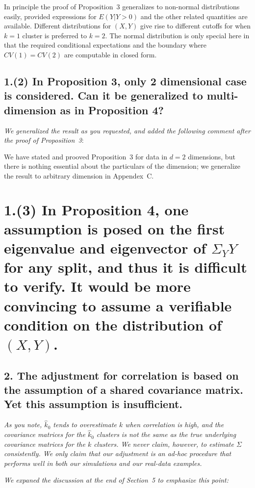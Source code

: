 \documentclass[11pt]{article}
\begin{document}
In principle the proof of Proposition~3 generalizes to non-normal
distributions easily, provided expressions for $E(Y | Y > 0)$ and the other
related quantities are available. Different distributions for $(X,Y)$ give
rise to different cutoffs for when $k = 1$ cluster is preferred to $k = 2$.
The normal distribution is only special here in that the required conditional
expectations and the boundary where $CV(1) = CV(2)$ are computable in closed
form. 


\subsection{1.(2) In Proposition 3, only 2 dimensional case is considered. Can
it be generalized to multi-dimension as in Proposition 4?}

\emph{We generalized the result as you requested, and added the following
comment after the proof of Proposition~3}: 

We have stated and prooved Proposition~3 for data in $d = 2$
dimensions, but there is nothing essential about the particulars of the
dimension; we generalize the result to arbitrary dimension in
Appendex~C.


\section{1.(3) In Proposition 4, one assumption is posed on the first eigenvalue
and eigenvector of $\Sigma_YY$ for any split, and thus it is difficult to
verify. It would be more convincing to assume a verifiable condition on the
distribution of $(X, Y)$.}


\subsection{2. The adjustment for correlation is based on the assumption of a
shared covariance matrix. Yet this assumption is insufficient.}

\emph{As you note, $\hat{k}_0$ tends to overestimate $k$ when correlation is high,
and the covariance matrices for the  $\hat{k}_0$ clusters is not the same as
the true underlying covariance matrices for the $k$ clusters. We never claim,
however, to estimate $\Sigma$ consistently. We only claim that our adjustment
is an ad-hoc procedure that performs well in both our simulations and our
real-data examples.}

\emph{We expaned the discussion at the end of Section~5 to emphasize this point:}
\end{document}
